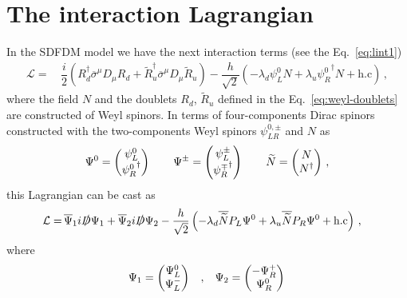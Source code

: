 \section{The interaction Lagrangian}
\label{sec:lag-interaction}
%
In the SDFDM model we have the next interaction terms (see the Eq.~\ref{eq:lint1})
\begin{align}
\label{eq:lint-weil}
\mathcal{L} = \, & \dfrac{i}{2}\left(
  R_d^{\dagger}\overline{\sigma}^{\mu}D_{\mu}R_d 
+  \widetilde{R}_u^{\dagger}\overline{\sigma}^{\mu}D_{\mu}\widetilde{R}_u \right)
- \dfrac{h}{\sqrt{2}}\left(-\lambda_d\psi_L^0N + \lambda_u{\psi_R^0}^{\dagger}N+\text{h.c}\right)\,,
\end{align}
%
where the field $N$ and the doublets $R_d$, $\widetilde{R}_u$ defined in the Eq.~\ref{eq:weyl-doublets} are constructed of Weyl spinors. 
%
In terms of four-components Dirac spinors constructed with the two-components Weyl spinors $\psi_{LR}^{0,\pm}$ and $N$ as 
%
\begin{align}
\Psi^0=\begin{pmatrix}
\psi_L^0 \\ {\psi_R^0}^{\dagger} 
\end{pmatrix}
\hspace{0.7 cm}
\Psi^{\pm}=\begin{pmatrix}
\psi_L^{\pm} \\ {\psi_R^{\mp}}^{\dagger} 
\end{pmatrix}
\hspace{0.7 cm}
\widetilde{N}=\begin{pmatrix}
N \\ N^{\dagger} 
\end{pmatrix}\,,
\end{align}
%
this Lagrangian can be cast as 
%
\begin{align}
\label{eq:lint-dirac}
\mathcal{L}
=\, & \overline{\Psi}_1i\slashed{D}\Psi_1 + \overline{\Psi}_2 i\slashed{D}\Psi_2
- \dfrac{h}{\sqrt{2}}\left(-\lambda_d\overline{\widetilde{N}}P_L\Psi^0 + \lambda_u \overline{\widetilde{N}}P_R\Psi^0+\text{h.c}\right)\,,
\end{align}
%
where
%
\begin{align}
\Psi_1=\begin{pmatrix}
\Psi_L^0 \\ \Psi_L^-
\end{pmatrix}
\hspace{0.3 cm} , \hspace{0.3 cm}
\Psi_2=\begin{pmatrix}
-\Psi_R^+ \\ \Psi_R^0 
\end{pmatrix}\,
\end{align}
